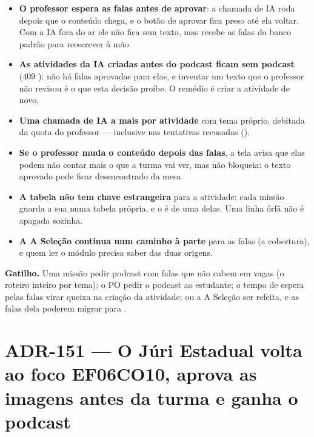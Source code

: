 \begin{itemize}
  \item \textbf{O professor espera as falas antes de aprovar}: a chamada de IA
    roda depois que o conteúdo chega, e o botão de aprovar fica preso até ela
    voltar. Com a IA fora do ar ele não fica sem texto, mas recebe as falas do
    banco padrão para reescrever à mão.
  \item \textbf{As atividades da IA criadas antes do podcast ficam sem
    podcast} (409 ): não há falas aprovadas para
    elas, e inventar um texto que o professor não revisou é o que esta decisão
    proíbe. O remédio é criar a atividade de novo.
  \item \textbf{Uma chamada de IA a mais por atividade} com tema próprio,
    debitada da quota do professor --- inclusive nas tentativas recusadas
    ().
  \item \textbf{Se o professor muda o conteúdo depois das falas}, a tela avisa
    que elas podem não contar mais o que a turma vai ver, mas não bloqueia: o
    texto aprovado pode ficar desencontrado da mesa.
  \item \textbf{A tabela não tem chave estrangeira} para a atividade: cada
    missão guarda a sua numa tabela própria, e o  é de uma
    delas. Uma linha órfã não é apagada sozinha.
  \item \textbf{A A Seleção continua num caminho à parte} para as falas (a
    cobertura), e quem ler o módulo precisa saber das duas origens.
\end{itemize}

\textbf{Gatilho.} Uma missão pedir podcast com falas que não cabem em vagas
(o roteiro inteiro por tema); o PO pedir o podcast ao estudante; o tempo de
espera pelas falas virar queixa na criação da atividade; ou a A Seleção ser
refeita, e as falas dela poderem migrar para .

\section{ADR-151 --- O Júri Estadual volta ao foco EF06CO10, aprova as imagens antes da turma e ganha o podcast}
\label{adr:exp06ef1b-ajustes-do-po}

